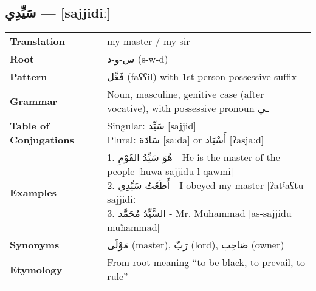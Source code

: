 \documentclass[a4paper,12pt]{article}
\begin{document}
\subsection{\textarabic{سَيِّدِي} — [sajjidiː]}
\begin{tabular}{p{3cm}p{10cm}}
\toprule
\textbf{Translation} & my master / my sir \\
\textbf{Root} & \textarabic{س-و-د} (s-w-d) \\
\textbf{Pattern} & \textarabic{فَعِّل} (faʕʕil) with 1st person possessive suffix \\
\textbf{Grammar} & Noun, masculine, genitive case (after vocative), with possessive pronoun \textarabic{ـي} \\
\textbf{Table of Conjugations} & \makecell[l]{
Singular: \textarabic{سَيِّد} [sajjid]\\
Plural: \textarabic{سَادَة} [saːda] or \textarabic{أَسْيَاد} [ʔasjaːd]
} \\
\textbf{Examples} & \makecell[l]{\parbox{9.5cm}{
1. \textarabic{هُوَ سَيِّدُ القَوْمِ} - He is the master of the people [huwa sajjidu l-qawmi]\\
2. \textarabic{أَطَعْتُ سَيِّدِي} - I obeyed my master [ʔatˤaʕtu sajjidiː]\\
3. \textarabic{السَّيِّدُ مُحَمَّد} - Mr. Muhammad [as-sajjidu muħammad]
}} \\
\midrule
\textbf{Synonyms} & \textarabic{مَوْلَى} (master), \textarabic{رَبّ} (lord), \textarabic{صَاحِب} (owner) \\
\textbf{Etymology} & From root meaning ``to be black, to prevail, to rule'' \\
\bottomrule
\end{tabular}
\end{document}
